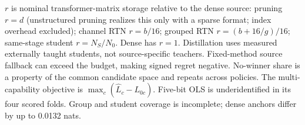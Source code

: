 \begin{table}[tb]
\begin{tabular}{llrrrr}
\hline
\end{tabular}
\par\smallskip
\begin{minipage}{\linewidth}\footnotesize
$r$ is nominal transformer-matrix storage relative to the dense source: pruning $r=d$ (unstructured pruning realizes this only with a sparse format; index overhead excluded); channel RTN $r=b/16$; grouped RTN $r=(b+16/g)/16$; same-stage student $r=N_S/N_0$. Dense has $r=1$. Distillation uses measured externally taught students, not source-specific teachers. Fixed-method source fallback can exceed the budget, making signed regret negative. No-winner share is a property of the common candidate space and repeats across policies. The multi-capability objective is $\max_c(\widehat L_c-L_{0c})$. Five-bit OLS is underidentified in its four scored folds. Group and student coverage is incomplete; dense anchors differ by up to 0.0132 nats.
\end{minipage}
\end{table}
